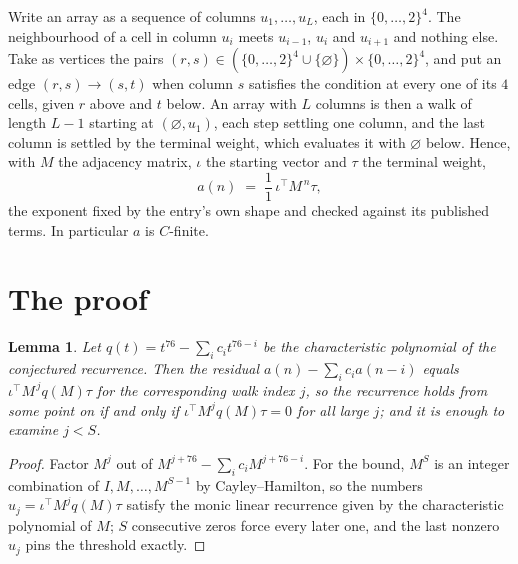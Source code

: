 \documentclass[11pt,a4paper]{article}
\theoremstyle{plain}
\newtheorem{lemma}[theorem]{Lemma}
\theoremstyle{definition}
\begin{document}
Write an array as a sequence of columns $u_1,\dots,u_L$, each in
$\{0,\dots,2\}^{4}$. The neighbourhood of a cell in column $u_i$ meets $u_{i-1}$,
$u_i$ and $u_{i+1}$ and nothing else. Take as vertices the pairs
$(r,s)\in(\{0,\dots,2\}^{4}\cup\{\varnothing\})\times\{0,\dots,2\}^{4}$,
and put an edge $(r,s)\to(s,t)$ when column $s$ satisfies the condition at every one of its
$4$ cells, given $r$ above and $t$ below. An array with $L$ columns is then a walk of length
$L-1$ starting at $(\varnothing,u_1)$, each step settling one column, and the last column is
settled by the terminal weight, which evaluates it with $\varnothing$ below. Hence,
with $M$ the adjacency matrix, $\iota$ the starting vector and $\tau$ the terminal weight,
\[
a(n)\;=\;\frac{1}{1}\,\iota^{\!\top}M^{\,n}\tau ,
\]
the exponent fixed by the entry's own shape and checked against its published terms. In
particular $a$ is $C$-finite.

\section{The proof}

\begin{lemma}\label{lem:crit}
Let $q(t)=t^{76}-\sum_i c_it^{76-i}$ be the characteristic polynomial of the
conjectured recurrence. Then the residual $a(n)-\sum_ic_ia(n-i)$ equals
$\iota^{\!\top}M^{\,j}q(M)\tau$ for the corresponding walk index $j$, so the
recurrence holds from some point on if and only if $\iota^{\!\top}M^{j}q(M)\tau=0$ for all
large $j$; and it is enough to examine $j<S$.
\end{lemma}

\begin{proof}
Factor $M^{j}$ out of $M^{j+76}-\sum_ic_iM^{j+76-i}$. For the bound, $M^{S}$
is an integer combination of $I,M,\dots,M^{S-1}$ by Cayley--Hamilton, so the numbers
$u_j=\iota^{\!\top}M^{j}q(M)\tau$ satisfy the monic linear recurrence given by the
characteristic polynomial of $M$; $S$ consecutive zeros force every later one, and the last
nonzero $u_j$ pins the threshold exactly.
\end{proof}
\end{document}
